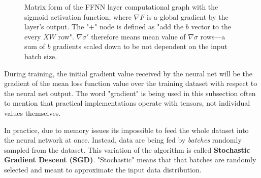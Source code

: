 \documentclass[thesis=B,english]{FITthesis}[2019/12/23]
\begin{document}
	\begin{figure}[h]
		\centering
		\caption{Matrix form of the FFNN layer computational graph with the sigmoid activation function, where $\nabla F$ is a global gradient by the layer's output. The "$+$" node is defined as "add the $b$ vector to the every $XW$ row". $\nabla \sigma '$ therefore means mean value of $\nabla \sigma$ rows---a sum of $b$ gradients scaled down to be not dependent on the input batch size.}
	\end{figure}
	
	During training, the initial gradient value received by the neural net will be the gradient of the mean loss function value over the training dataset with respect to the neural net output. The word "gradient" is being used in this subsection often to mention that practical implementations operate with tensors, not individual values themselves.
	
	In practice, due to memory issues its impossible to feed the whole dataset into the neural network at once. Instead, data are being fed by \textit{batches} randomly sampled from the dataset. This variation of the algorithm is called \textbf{Stochastic Gradient Descent (SGD)}. "Stochastic" means that that batches are randomly selected and meant to approximate the input data distribution.
	
\end{document}
